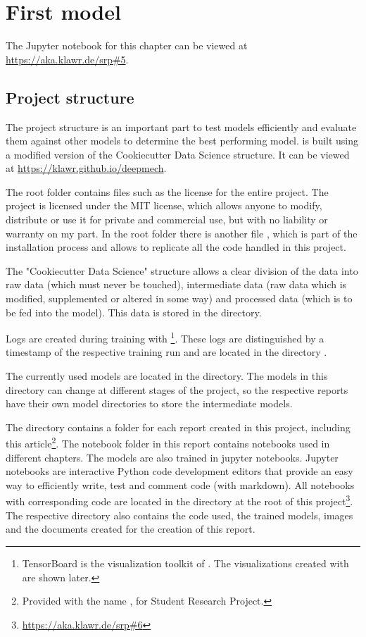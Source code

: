 \section{First model}

The Jupyter notebook for this chapter can be viewed at \url{https://aka.klawr.de/srp\#5}.

\subsection{Project structure}

The project structure is an important part to test models efficiently and evaluate them against other models to determine the best performing model.
 is built using a modified version of the Cookiecutter Data Science \cite{drivendata2019} structure. It can be viewed at \url{https://klawr.github.io/deepmech}.

The root folder contains files such as the license for the entire project.
The project is licensed under the MIT license, which allows anyone to modify, distribute or use it for private and commercial use, but with no liability or warranty on my part.
In the root folder there is another file , which is part of the installation process and allows to replicate all the code handled in this project.

The "Cookiecutter Data Science" structure allows a clear division of the data into raw data (which must never be touched), intermediate data (raw data which is modified, supplemented or altered in some way) and processed data (which is to be fed into the model).
This data is stored in the  directory.

Logs are created during training with \footnote{TensorBoard is the visualization toolkit of . The visualizations created with  are shown later.}.
These logs are distinguished by a timestamp of the respective training run and are located in the directory .

The currently used models are located in the  directory.
The models in this directory can change at different stages of the project, so the respective reports have their own model directories to store the intermediate models.

The  directory contains a folder for each report created in this project, including this article\footnote{Provided with the name , for Student Research Project.}.
The notebook folder in this report contains  notebooks \cite{Jupyter2019} used in different chapters.
The models are also trained in jupyter notebooks. 
Jupyter notebooks are interactive Python code development editors that provide an easy way to efficiently write, test and comment code (with markdown).
All notebooks with corresponding code are located in the  directory at the root of this project\footnote{\url{https://aka.klawr.de/srp\#6}}.
The respective directory also contains the code used, the trained models, images and the documents created for the creation of this report.


